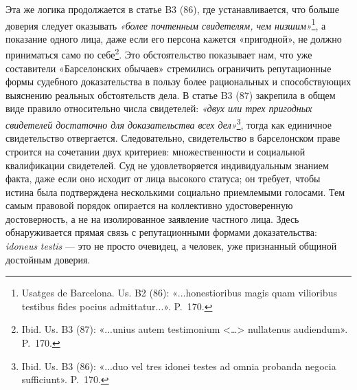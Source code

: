 Эта же логика продолжается в статье B3 (86), где устанавливается, что больше доверия следует оказывать \emph{«более почтенным свидетелям, чем низшим»}\footnote{Usatges de Barcelona. Us. B2 (86): «...honestioribus magis quam vilioribus testibus fides pocius admittatur...». P.~170.}, а показание одного лица, даже если его персона кажется «пригодной», не должно приниматься само по себе\footnote{Ibid. Us. B3 (87): «...unius autem testimonium <…> nullatenus audiendum». P.~170.}. Это обстоятельство показывает нам, что уже составители «Барселонских обычаев» стремились ограничить репутационные формы судебного доказательства в пользу более рациональных и способствующих выяснению реальных обстоятельств дела. В статье B3 (87) закрепила в общем виде правило относительно числа свидетелей: \emph{«двух или трех пригодных свидетелей достаточно для доказательства всех дел»}\footnote{Ibid. Us. B3 (86): «...duo vel tres idonei testes ad omnia probanda negocia sufficiunt». P.~170.}, тогда как единичное свидетельство отвергается. Следовательно, свидетельство в барселонском праве строится на сочетании двух критериев: множественности и социальной квалификации свидетелей. Суд не удовлетворяется индивидуальным знанием факта, даже если оно исходит от лица высокого статуса; он требует, чтобы истина была подтверждена несколькими социально приемлемыми голосами. Тем самым правовой порядок опирается на коллективно удостоверенную достоверность, а не на изолированное заявление частного лица. Здесь обнаруживается прямая связь с репутационными формами доказательства: \emph{idoneus}\emph{ }\emph{testis} --- это не просто очевидец, а человек, уже признанный общиной достойным доверия.

